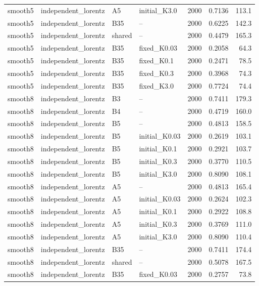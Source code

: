 \begin{longtable}{llllrrr}
smooth5 & independent\_lorentz & A5 & initial\_K3.0 & 2000 & 0.7136 & 113.1 \\
smooth5 & independent\_lorentz & B35 & -- & 2000 & 0.6225 & 142.3 \\
smooth5 & independent\_lorentz & shared & -- & 2000 & 0.4479 & 165.3 \\
smooth5 & independent\_lorentz & B35 & fixed\_K0.03 & 2000 & 0.2058 & 64.3 \\
smooth5 & independent\_lorentz & B35 & fixed\_K0.1 & 2000 & 0.2471 & 78.5 \\
smooth5 & independent\_lorentz & B35 & fixed\_K0.3 & 2000 & 0.3968 & 74.3 \\
smooth5 & independent\_lorentz & B35 & fixed\_K3.0 & 2000 & 0.7724 & 74.4 \\
smooth8 & independent\_lorentz & B3 & -- & 2000 & 0.7411 & 179.3 \\
smooth8 & independent\_lorentz & B4 & -- & 2000 & 0.4719 & 160.0 \\
\rowcolor{oursbg}
smooth8 & independent\_lorentz & B5 & -- & 2000 & 0.4813 & 158.5 \\
\rowcolor{oursbg}
smooth8 & independent\_lorentz & B5 & initial\_K0.03 & 2000 & 0.2619 & 103.1 \\
\rowcolor{oursbg}
smooth8 & independent\_lorentz & B5 & initial\_K0.1 & 2000 & 0.2921 & 103.7 \\
\rowcolor{oursbg}
smooth8 & independent\_lorentz & B5 & initial\_K0.3 & 2000 & 0.3770 & 110.5 \\
\rowcolor{oursbg}
smooth8 & independent\_lorentz & B5 & initial\_K3.0 & 2000 & 0.8090 & 108.1 \\
smooth8 & independent\_lorentz & A5 & -- & 2000 & 0.4813 & 165.4 \\
smooth8 & independent\_lorentz & A5 & initial\_K0.03 & 2000 & 0.2624 & 102.3 \\
smooth8 & independent\_lorentz & A5 & initial\_K0.1 & 2000 & 0.2922 & 108.8 \\
smooth8 & independent\_lorentz & A5 & initial\_K0.3 & 2000 & 0.3769 & 111.0 \\
smooth8 & independent\_lorentz & A5 & initial\_K3.0 & 2000 & 0.8090 & 110.4 \\
smooth8 & independent\_lorentz & B35 & -- & 2000 & 0.7411 & 174.4 \\
smooth8 & independent\_lorentz & shared & -- & 2000 & 0.5078 & 167.5 \\
smooth8 & independent\_lorentz & B35 & fixed\_K0.03 & 2000 & 0.2757 & 73.8 \\

\end{longtable}
